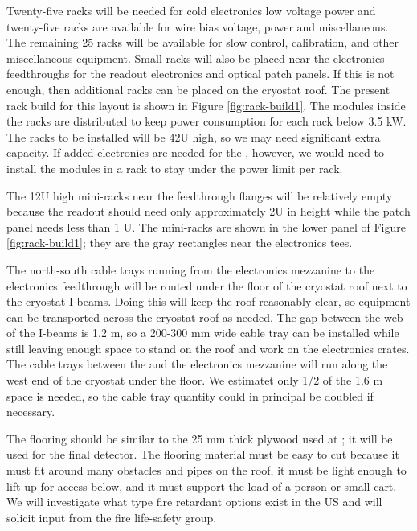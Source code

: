 Twenty-five racks will be needed for cold electronics low voltage power and twenty-five racks are available for  wire bias voltage,  power and miscellaneous. 
The remaining 25 racks will be available for slow control, calibration, and other miscellaneous equipment. 
Small racks will also be placed near the electronics feedthroughs for the  readout electronics and optical patch panels. 
If this is not enough, then additional racks can be placed on the cryostat roof. 
The present rack build for this layout is shown in Figure \ref{fig:rack-build1}. The modules inside the racks are distributed to keep power consumption for each rack below 3.5 \si{kW}.
The racks to be installed will be 42U high, so we may need significant extra capacity.  If added electronics are needed for the , however, we would need to install the modules in a  rack to stay under the power limit per rack.

The 12U high mini-racks near the feedthrough flanges will be relatively empty because the  readout should need only approximately 2U in height while the  patch panel needs less than 1 U. The mini-racks are shown in the lower panel of Figure \ref{fig:rack-build1}; they are the gray rectangles near the electronics tees.

The north-south cable trays running from the electronics mezzanine to the electronics feedthrough will be routed under the floor of the cryostat roof next to the cryostat I-beams. 
Doing this will keep the roof reasonably clear, so equipment can be transported across the cryostat roof as needed. 
The gap between the web of the I-beams is 1.2 \si{m}, so a 200-300 \si{mm} wide cable tray can be installed while still leaving enough space to stand on the roof and work on the electronics crates. 
The cable trays between the  and the electronics mezzanine will run along the west end of the cryostat under the floor. 
We estimatet only 1/2 of the 1.6 \si{m} space is needed, so the cable tray quantity could in principal be doubled if necessary. 

The flooring should be similar to the 25 \si{mm} thick plywood used at ; it will be used for the final  detector. 
The flooring material must be easy to cut because it must fit around many obstacles and pipes on the roof, it must be light enough to lift up for access below, and it must support the load of a person or small cart. 
We will investigate what type fire retardant options exist in the US and will solicit input from the  fire life-safety group. 

